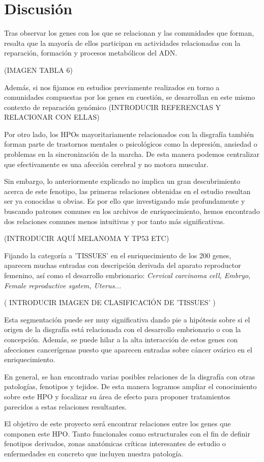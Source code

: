 \section{Discusión}

Tras observar los genes con los que se relacionan y las comunidades que forman, resalta que la mayoría de ellos participan en actividades relacionadas con la reparación, formación y procesos metabólicos del ADN.

(IMAGEN TABLA 6)

Además, si nos fijamos en estudios previamente realizados en torno a comunidades compuestas por los genes en cuestión, se desarrollan en este mismo contexto de reparación genómico (INTRODUCIR REFERENCIAS Y RELACIONAR CON ELLAS)

Por otro lado, los HPOs mayoritariamente relacionados con la disgrafía también forman parte de trastornos mentales o psicológicos como la depresión, ansiedad o problemas en la sincronización de la marcha. De esta manera podemos centralizar que efectivamente es una afección cerebral y no motora muscular.

Sin embargo, lo anteriormente explicado no implica un gran descubrimiento acerca de este fenotipo, las primeras relaciones obtenidas en el estudio resultan ser ya conocidas u obvias. Es por ello que investigando más profundamente y buscando patrones comunes en los archivos de enriquecimiento, hemos encontrado dos relaciones comunes menos intuitivas y por tanto más significativas.

(INTRODUCIR AQUÍ MELANOMA Y TP53 ETC)

Fijando la categoría a 'TISSUES' en el enriquecimiento de los 200 genes, aparecen muchas entradas con descripción derivada del aparato reproductor femenino, así como el desarrollo embrionario: \textit{ Cervical carcinoma cell, Embryo, Female reproductive system, Uterus... }

( INTRODUCIR IMAGEN DE CLASIFICACIÓN DE 'TISSUES' )

Esta segmentación puede ser muy significativa dando pie a hipótesis sobre si el origen de la disgrafía está relacionada con el desarrollo embrionario o con la concepción. Además, se puede hilar a la alta interacción de estos genes con afecciones cancerígenas puesto que aparecen entradas sobre cáncer ovárico en el enriquecimiento.

En general, se han encontrado varias posibles relaciones de la disgrafía con otras patologías, fenotipos y tejidos. De esta manera logramos ampliar el conocimiento sobre este HPO y focalizar su área de efecto para proponer tratamientos parecidos a estas relaciones resultantes.



El objetivo de este proyecto será encontrar relaciones entre los genes que componen este HPO. Tanto funcionales como estructurales con el fin de definir fenotipos derivados, zonas anatómicas críticas interesantes de estudio o enfermedades en concreto que incluyen nuestra patología.